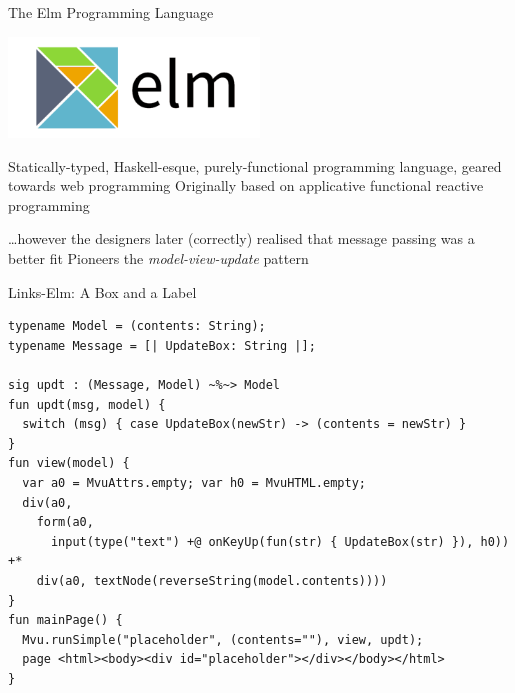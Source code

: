 \documentclass[11.5pt, aspectratio=169]{beamer}
\begin{document}
\begin{frame}{The Elm Programming Language}

  \begin{center}
    \includegraphics[width=0.5\textwidth]{images/ElmLogo.png}
  \end{center}

  \begin{fullpageitemize}
  \itemR Statically-typed, Haskell-esque, purely-functional programming language, geared towards web programming
  \itemR Originally based on applicative functional reactive programming
    \begin{itemize}
      \itemR \ldots however the designers later (correctly) realised that message passing was a better fit
      \itemR Pioneers the \emph{model-view-update} pattern
    \end{itemize}
  \end{fullpageitemize}

\end{frame}

\begin{frame}[fragile]{Links-Elm: A Box and a Label}

\begin{lstlisting}[language=Links]
typename Model = (contents: String);
typename Message = [| UpdateBox: String |];

sig updt : (Message, Model) ~%~> Model
fun updt(msg, model) {
  switch (msg) { case UpdateBox(newStr) -> (contents = newStr) }
}
fun view(model) {
  var a0 = MvuAttrs.empty; var h0 = MvuHTML.empty;
  div(a0,
    form(a0,
      input(type("text") +@ onKeyUp(fun(str) { UpdateBox(str) }), h0)) +*
    div(a0, textNode(reverseString(model.contents))))
}
fun mainPage() {
  Mvu.runSimple("placeholder", (contents=""), view, updt);
  page <html><body><div id="placeholder"></div></body></html>
}
\end{lstlisting}
\end{frame}
\end{document}
